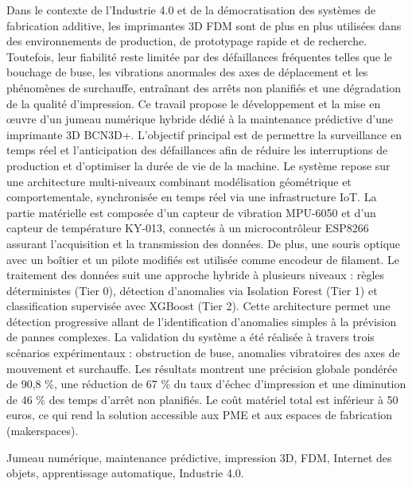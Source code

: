 \begin{abstractFr}
	Dans le contexte de l’Industrie 4.0 et de la démocratisation des systèmes de fabrication additive, les imprimantes 3D FDM sont de plus en plus utilisées dans des environnements de production, de prototypage rapide et de recherche. Toutefois, leur fiabilité reste limitée par des défaillances fréquentes telles que le bouchage de buse, les vibrations anormales des axes de déplacement et les phénomènes de surchauffe, entraînant des arrêts non planifiés et une dégradation de la qualité d’impression. 
	Ce travail propose le développement et la mise en œuvre d’un jumeau numérique hybride dédié à la maintenance prédictive d’une imprimante 3D BCN3D+. L’objectif principal est de permettre la surveillance en temps réel et l’anticipation des défaillances afin de réduire les interruptions de production et d’optimiser la durée de vie de la machine. 
	Le système repose sur une architecture multi-niveaux combinant modélisation géométrique et comportementale, synchronisée en temps réel via une infrastructure IoT. La partie matérielle est composée d’un capteur de vibration MPU-6050 et d’un capteur de température KY-013, connectés à un microcontrôleur ESP8266 assurant l’acquisition et la transmission des données. De plus, une souris optique avec un boîtier et un pilote modifiés est utilisée comme encodeur de filament. 
	Le traitement des données suit une approche hybride à plusieurs niveaux : règles déterministes (Tier 0), détection d’anomalies via Isolation Forest (Tier 1) et classification supervisée avec XGBoost (Tier 2). Cette architecture permet une détection progressive allant de l’identification d’anomalies simples à la prévision de pannes complexes. 
	La validation du système a été réalisée à travers trois scénarios expérimentaux : obstruction de buse, anomalies vibratoires des axes de mouvement et surchauffe. Les résultats montrent une précision globale pondérée de 90,8 \%, une réduction de 67 \% du taux d’échec d’impression et une diminution de 46 \% des temps d’arrêt non planifiés. Le coût matériel total est inférieur à 50 euros, ce qui rend la solution accessible aux PME et aux espaces de fabrication (makerspaces).
\end{abstractFr}

\begin{keywordsFr}
	Jumeau numérique, maintenance prédictive, impression 3D, FDM, Internet des objets, apprentissage automatique, Industrie 4.0.
\end{keywordsFr}